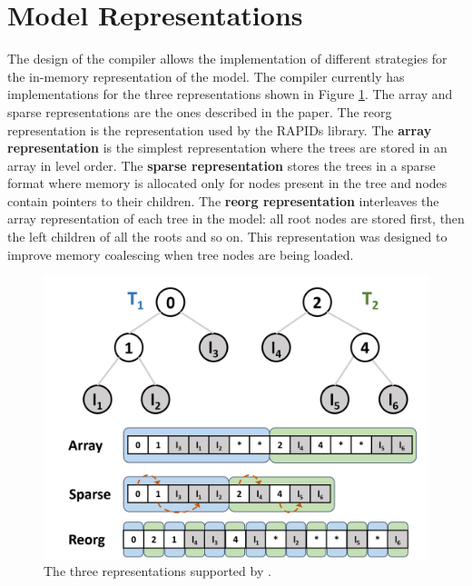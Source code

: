 \section{Model Representations}
\label{sec:representations}

The design of the \Treebeard{} compiler allows the implementation of different strategies for 
the in-memory representation of the model. The compiler currently has implementations for 
the three representations shown in Figure \ref{Fig:Representations}. The array and sparse 
representations are the ones described in the \TreebeardOLD{} paper\cite{Treebeard}. The reorg 
representation is the representation used by the RAPIDs library\cite{FIL}. 
The \textbf{array representation} is the simplest representation where the trees are stored in an array
in level order. The \textbf{sparse representation} stores the trees in a sparse format where 
memory is allocated only for nodes present in the tree and nodes contain pointers to their children. The \textbf{reorg representation}
interleaves the array representation of each tree in the model: all root nodes are stored first, then 
the left children of all the roots and so on. This representation was 
designed to improve memory coalescing when tree nodes are being loaded. 
\begin{figure}[htb]
  \centering
  \includegraphics[width=\linewidth]{figures/representations.png}
  \caption{The three representations supported by \Treebeard{}.}
  \label{Fig:Representations}
\end{figure}

